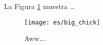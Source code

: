 \documentclass{article}
\begin{document}
La Figura \ref{fig:chick} 
muestra \ldots

\begin{figure}
\centering
\texttt{[image: es/big\_chick]}
\caption{\label{fig:chick}Aww\ldots.}
\end{figure}
\end{document}
